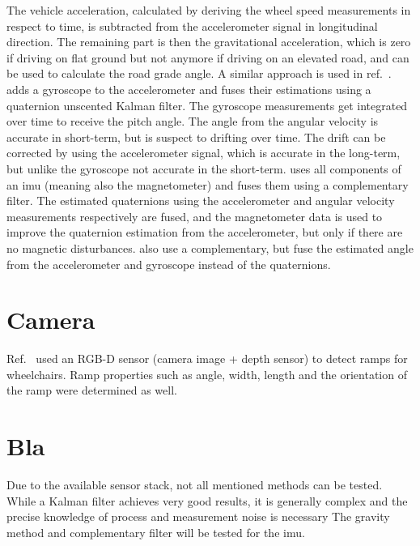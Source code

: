 The vehicle acceleration, calculated by deriving the wheel speed measurements in respect to time, is subtracted from the accelerometer signal in longitudinal direction.
The remaining part is then the gravitational acceleration, which is zero if driving on flat ground but not anymore if driving on an elevated road, and can be used to calculate the road grade angle.
A similar approach is used in ref.~\cite{Sentouh2008}.
\cite{He2020} adds a gyroscope to the accelerometer and fuses their estimations using a quaternion unscented Kalman filter.
The gyroscope measurements get integrated over time to receive the pitch angle.
The angle from the angular velocity is accurate in short-term, but is suspect to drifting over time.
The drift can be corrected by using the accelerometer signal, which is accurate in the long-term, but unlike the gyroscope not accurate in the short-term.
\cite{Wu2016} uses all components of an \gls{imu} (meaning also the magnetometer) and fuses them using a complementary filter.
The estimated quaternions using the accelerometer and angular velocity measurements respectively are fused, and the magnetometer data is used to improve the quaternion estimation from the accelerometer, but only if there are no magnetic disturbances.
\cite{Euston2008,Jauch2018} also use a complementary, but fuse the estimated angle from the accelerometer and gyroscope instead of the quaternions.



\section{}



\section{Camera}
Ref.~\cite{Nejati2016} used an RGB-D sensor (camera image + depth sensor) to detect ramps for wheelchairs.
Ramp properties such as angle, width, length and the orientation of the ramp were determined as well.



\section{Bla}
Due to the available sensor stack, not all mentioned methods can be tested.
While a Kalman filter achieves very good results, it is generally complex and the precise knowledge of process and measurement noise is necessary \cite{Higgins1975}
The gravity method and complementary filter will be tested for the \gls{imu}.


